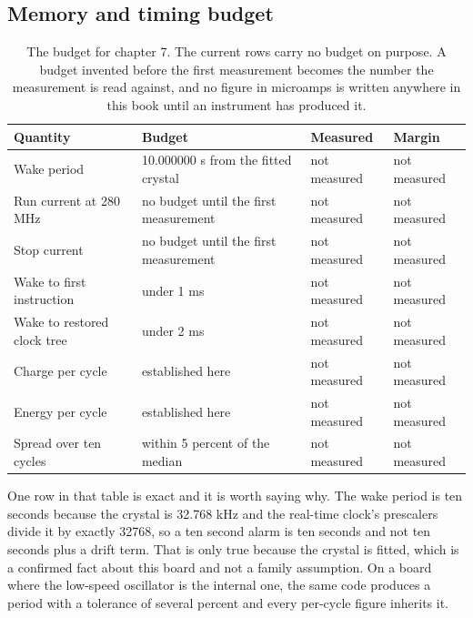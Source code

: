\subsection*{Memory and timing budget}


\begin{table}[H]\centering\small
\begin{tabular}{p{44mm}p{28mm}p{28mm}p{30mm}}
\toprule
Quantity & Budget & Measured & Margin \\
\midrule
Wake period & 10.000000 s from the fitted crystal & not measured & not measured \\
Run current at 280 MHz & no budget until the first measurement & not measured & not measured \\
Stop current & no budget until the first measurement & not measured & not measured \\
Wake to first instruction & under 1 ms & not measured & not measured \\
Wake to restored clock tree & under 2 ms & not measured & not measured \\
Charge per cycle & established here & not measured & not measured \\
Energy per cycle & established here & not measured & not measured \\
Spread over ten cycles & within 5 percent of the median & not measured & not measured \\
\bottomrule
\end{tabular}
\caption{The budget for chapter 7. The current rows carry no budget on purpose. A budget invented before the first measurement becomes the number the measurement is read against, and no figure in microamps is written anywhere in this book until an instrument has produced it.}
\end{table}

One row in that table is exact and it is worth saying why. The wake period is
ten seconds because the crystal is 32.768 kHz and the real-time clock's
prescalers divide it by exactly 32768, so a ten second alarm is ten seconds and
not ten seconds plus a drift term. That is only true because the crystal is
fitted, which is a confirmed fact about this board and not a family assumption.
On a board where the low-speed oscillator is the internal one, the same code
produces a period with a tolerance of several percent and every per-cycle figure
inherits it.

